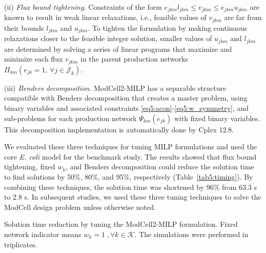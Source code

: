 (ii) \textit{Flux bound tightening}. Constraints of the form $ e_{jkm} l_{jkm} \le v_{jkm} \le e_{jkm} u_{jkm}$ are known to result in weak linear relaxations, i.e., feasible values of $v_{jkm}$ are far from their bounds $l_{jkm}$ and $u_{jkm}$. To tighten the formulation by making continuous relaxations closer to the feasible integer solution, smaller values of $u_{jkm}$ and $l_{jkm}$ are determined by solving a series of linear programs that maximize and minimize each flux $v_{jkm}$ in the parent production networks $\Pi_{km}(e_{jk}=1, \, \forall j \in \mathcal{J}_k)$.

(iii) \textit{Benders decomposition}. ModCell2-MILP has a separable structure compatible with Benders decomposition\citep{geoffrion1972, fischetti2016} that creates a  master problem, using binary variables and associated constraints \eqref{eq5:acon}-\eqref{eq5:w_symmetry}, and sub-problems for each production network $\Psi_{km}(e_{jk})$ with fixed binary variables. This decomposition implementation is automatically done by Cplex 12.8.

We evaluated these three techniques for tuning MILP formulations and used the core\textit{ E. coli} model\citep{garcia2019} for the benchmark study. The results showed that flux bound tightening, fixed $w_k$, and Benders decomposition could reduce the solution time to find solutions by 50\%, 80\%, and  95\%, respectively (Table~\ref{tab5:timing}). By combining these techniques, the solution time was shortened by 96\% from 63.3 s to 2.8 s. In subsequent studies, we used these three tuning techniques to solve the ModCell design problem unless otherwise noted.

\begin{table}[!ht]
    \caption[Solution time reduction by tuning the ModCell2-MILP formulation]{Solution time reduction by tuning the ModCell2-MILP formulation.
    Fixed network indicator means $w_k = 1\;, \forall k \in \mathcal{K}$. The simulations were performed in triplicates.
    }
    \centering
	
    \label{tab5:timing}
\end{table}

